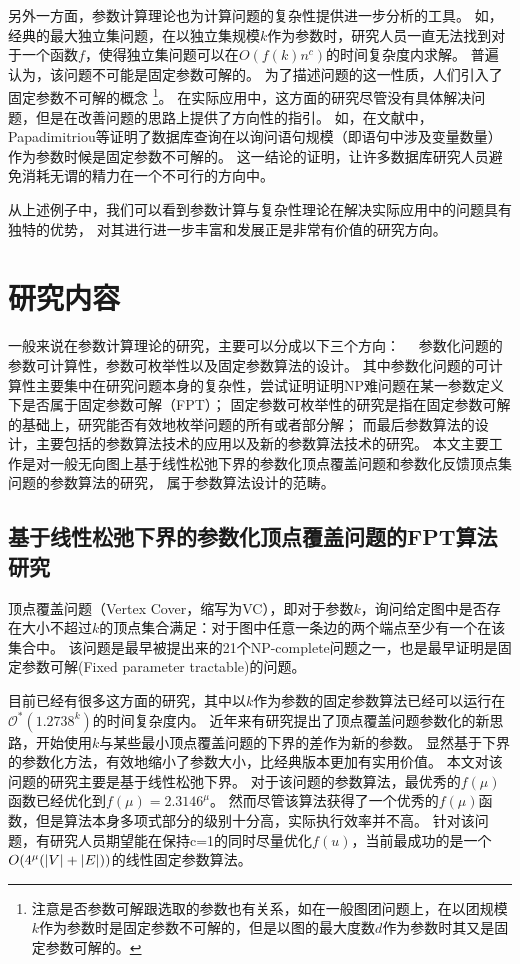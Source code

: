 另外一方面，参数计算理论也为计算问题的复杂性提供进一步分析的工具。
如，经典的最大独立集问题，在以独立集规模$k$作为参数时，研究人员一直无法找到对于一个函数$f$，使得独立集问题可以在$O(f(k)n^c)$的时间复杂度内求解。
普遍认为，该问题不可能是固定参数可解的。
为了描述问题的这一性质，人们引入了固定参数不可解的概念
\footnote{注意是否参数可解跟选取的参数也有关系，如在一般图团问题上，在以团规模$k$作为参数时是固定参数不可解的，但是以图的最大度数$d$作为参数时其又是固定参数可解的。}。
在实际应用中，这方面的研究尽管没有具体解决问题，但是在改善问题的思路上提供了方向性的指引。
如，在文献\cite{papadimitriou1997complexity}中，Papadimitriou等证明了数据库查询在以询问语句规模（即语句中涉及变量数量）作为参数时候是固定参数不可解的。
这一结论的证明，让许多数据库研究人员避免消耗无谓的精力在一个不可行的方向中。


从上述例子中，我们可以看到参数计算与复杂性理论在解决实际应用中的问题具有独特的优势，
对其进行进一步丰富和发展正是非常有价值的研究方向。


\section{研究内容}
一般来说在参数计算理论的研究，主要可以分成以下三个方向：　
参数化问题的参数可计算性，参数可枚举性以及固定参数算法的设计。
其中参数化问题的可计算性主要集中在研究问题本身的复杂性，尝试证明证明NP难问题在某一参数定义下是否属于固定参数可解（FPT）；
固定参数可枚举性的研究是指在固定参数可解的基础上，研究能否有效地枚举问题的所有或者部分解；
而最后参数算法的设计，主要包括的参数算法技术的应用以及新的参数算法技术的研究。
本文主要工作是对一般无向图上基于线性松弛下界的参数化顶点覆盖问题和参数化反馈顶点集问题的参数算法的研究，
属于参数算法设计的范畴。

\subsection{基于线性松弛下界的参数化顶点覆盖问题的FPT算法研究}
顶点覆盖问题（Vertex Cover，缩写为VC），即对于参数$k$，询问给定图中是否存在大小不超过$k$的顶点集合满足：对于图中任意一条边的两个端点至少有一个在该集合中。
该问题是最早被提出来的21个NP-complete问题之一，也是最早证明是固定参数可解(Fixed parameter tractable)的问题。

目前已经有很多这方面的研究，其中以$k$作为参数的固定参数算法已经可以运行在$\mathcal{O}^*(1.2738^k)$的时间复杂度内。
近年来有研究提出了顶点覆盖问题参数化的新思路，开始使用$k$与某些最小顶点覆盖问题的下界的差作为新的参数。
显然基于下界的参数化方法，有效地缩小了参数大小，比经典版本更加有实用价值。
本文对该问题的研究主要是基于线性松弛下界。
对于该问题的参数算法，最优秀的$f(\mu)$函数已经优化到$f(\mu) = 2.3146^\mu$。
然而尽管该算法获得了一个优秀的$f(\mu)$函数，但是算法本身多项式部分的级别十分高，实际执行效率并不高。
针对该问题，有研究人员期望能在保持c=1的同时尽量优化$f(u)$，当前最成功的是一个$O(4^{\mu}(\left\vert V \right\vert+\left\vert E \right\vert))$的线性固定参数算法。

